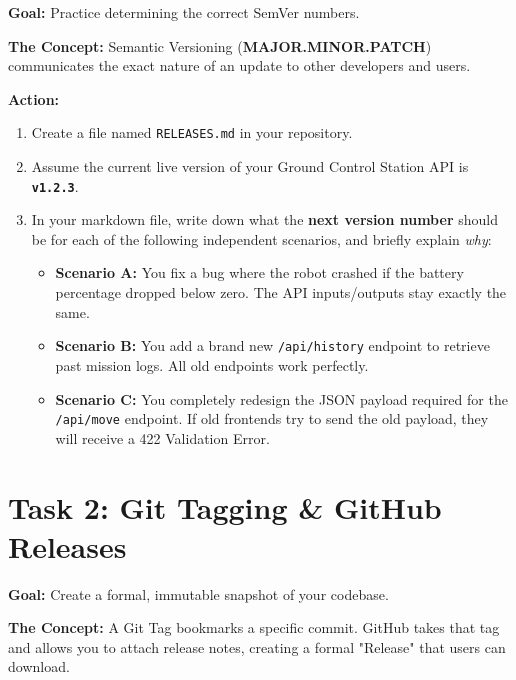 \documentclass[a4paper,12pt]{article}
\begin{document}
\textbf{Goal:} Practice determining the correct SemVer numbers.

\textbf{The Concept:} Semantic Versioning (\textbf{MAJOR.MINOR.PATCH}) communicates the exact nature of an update to other developers and users.

\vspace{0.3cm}
\textbf{Action:}
\begin{enumerate}
    \item Create a file named \texttt{RELEASES.md} in your repository.
    \item Assume the current live version of your Ground Control Station API is \textbf{\texttt{v1.2.3}}.
    \item In your markdown file, write down what the \textbf{next version number} should be for each of the following independent scenarios, and briefly explain \textit{why}:
    \begin{itemize}
        \item \textbf{Scenario A:} You fix a bug where the robot crashed if the battery percentage dropped below zero. The API inputs/outputs stay exactly the same.
        \item \textbf{Scenario B:} You add a brand new \texttt{/api/history} endpoint to retrieve past mission logs. All old endpoints work perfectly.
        \item \textbf{Scenario C:} You completely redesign the JSON payload required for the \texttt{/api/move} endpoint. If old frontends try to send the old payload, they will receive a 422 Validation Error.
    \end{itemize}
\end{enumerate}


\section*{Task 2: Git Tagging \& GitHub Releases}

\textbf{Goal:} Create a formal, immutable snapshot of your codebase.

\textbf{The Concept:} A Git Tag bookmarks a specific commit. GitHub takes that tag and allows you to attach release notes, creating a formal "Release" that users can download.
\end{document}
